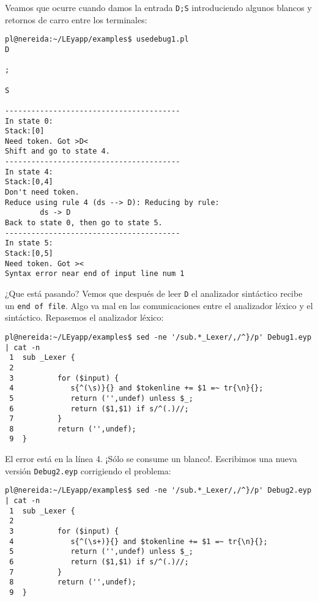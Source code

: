 Veamos que ocurre cuando damos la entrada \verb|D;S| introduciendo algunos blancos y retornos de carro
entre los terminales:
\begin{verbatim}
pl@nereida:~/LEyapp/examples$ usedebug1.pl
D

;

S

----------------------------------------
In state 0:
Stack:[0]
Need token. Got >D<
Shift and go to state 4.
----------------------------------------
In state 4:
Stack:[0,4]
Don't need token.
Reduce using rule 4 (ds --> D): Reducing by rule:
        ds -> D
Back to state 0, then go to state 5.
----------------------------------------
In state 5:
Stack:[0,5]
Need token. Got ><
Syntax error near end of input line num 1
\end{verbatim}
¿Que está pasando?
Vemos que después de leer \verb|D| el analizador sintáctico recibe 
un \verb|end of file|. Algo va mal en las comunicaciones entre el analizador léxico
y el sintáctico. Repasemos el analizador léxico:
\begin{verbatim}
pl@nereida:~/LEyapp/examples$ sed -ne '/sub.*_Lexer/,/^}/p' Debug1.eyp | cat -n
 1  sub _Lexer {
 2
 3          for ($input) {
 4             s{^(\s)}{} and $tokenline += $1 =~ tr{\n}{};
 5             return ('',undef) unless $_;
 6             return ($1,$1) if s/^(.)//;
 7          }
 8          return ('',undef);
 9  }
\end{verbatim}
El error está en la línea 4. ¡Sólo se consume un blanco!.
Escribimos una nueva versión \verb|Debug2.eyp| corrigiendo el 
problema:
\begin{verbatim}
pl@nereida:~/LEyapp/examples$ sed -ne '/sub.*_Lexer/,/^}/p' Debug2.eyp | cat -n
 1  sub _Lexer {
 2
 3          for ($input) {
 4             s{^(\s+)}{} and $tokenline += $1 =~ tr{\n}{};
 5             return ('',undef) unless $_;
 6             return ($1,$1) if s/^(.)//;
 7          }
 8          return ('',undef);
 9  }
\end{verbatim}

